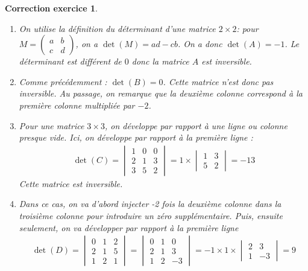 \documentclass[12pt]{article}
\newtheorem{correction}{\bf Correction exercice}
\newenvironment{cor}{
\begin{correction}\smallskip\normalfont}{\end{correction}
}
\begin{document}
\begin{cor}
  \begin{enumerate}
  \item On utilise la d\'efinition du d\'eterminant d'une matrice $2 \times 2$:
    pour $M =
    \begin{pmatrix}
      a & b
      \\
      c & d
    \end{pmatrix}
    $, on a $\det(M) = ad - cb$. On a donc $\det(A) = -1$. Le déterminant est différent de $0$
    donc la matrice $A$ est inversible.

  \item Comme précédemment : $\det(B) = 0$. Cette matrice n'est donc pas inversible.
    Au passage, on remarque que la deuxième colonne correspond
    à la première colonne multipliée par $-2$.

  \item Pour une matrice $3 \times 3$, on d\'eveloppe par rapport à une ligne
    ou colonne presque vide. Ici, on développe par rapport à la première ligne :
    \begin{align*}
      \det(C) =
      \begin{vmatrix}
        1 & 0 & 0
        \\
        2 & 1 & 3
        \\
        3 & 5 & 2
      \end{vmatrix}
      = 1 \times
      \begin{vmatrix}
        1 & 3
        \\
        5 & 2
      \end{vmatrix}
      = - 13
    \end{align*}
    Cette matrice est inversible.

  \item Dans ce cas, on va d'abord injecter -2 fois la deuxième colonne dans la troisième colonne
    pour introduire un zéro supplémentaire. Puis, ensuite seulement, on va développer par rapport
    à la première ligne
    \begin{align*}
      \det(D) =
      \begin{vmatrix}
        0 & 1 & 2
        \\
        2 & 1 & 5
        \\
        1 & 2 & 1
      \end{vmatrix}
      =
      \begin{vmatrix}
        0 & 1 & 0
        \\
        2 & 1 & 3
        \\
        1 & 2 & -3
      \end{vmatrix}
      = -1 \times 1 \times
      \begin{vmatrix}
        2 & 3
        \\
        1 & -3
      \end{vmatrix}
      = 9
    \end{align*}


\end{enumerate}
\end{cor}
\end{document}
